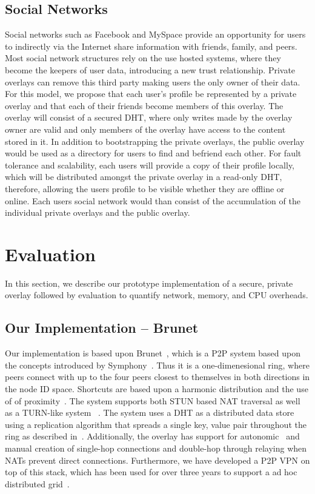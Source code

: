 \documentclass[conference]{IEEEtran}
\begin{document}
\subsection{Social Networks}
Social networks such as Facebook and MySpace provide an opportunity for users to
indirectly via the Internet share information with friends, family, and peers.
Most social network structures rely on the use hosted systems, where they become
the keepers of user data, introducing a new trust relationship.  Private overlays
can remove this third party making users the only owner of their data.  For this
model, we propose that each user's profile be represented by a private overlay
and that each of their friends become members of this overlay.  The overlay will
consist of a secured DHT, where only writes made by the overlay owner are valid
and only members of the overlay have access to the content stored in it.  In
addition to bootstrapping the private overlays, the public overlay would be
used as a directory for users to find and befriend each other.  For fault
tolerance and scalability, each users will provide a copy of their profile
locally, which will be distributed amongst the private overlay in a read-only
DHT, therefore, allowing the users profile to be visible whether they are
offline or online.  Each users social network would than consist of the
accumulation of the individual private overlays and the public overlay.

\section{Evaluation}
\label{evaluations}
In this section, we describe our prototype implementation of a secure, private
overlay followed by evaluation to quantify network, memory, and CPU overheads.

\subsection{Our Implementation -- Brunet}
Our implementation is based upon Brunet~\cite{brunet}, which is a P2P system
based upon the concepts introduced by Symphony~\cite{symphony}.  Thus it is a
one-dimenesional ring, where peers connect with up to the four peers closest
to themselves in both directions in the node ID space.  Shortcuts are based
upon a harmonic distribution and the use of of proximity~\cite{hpdc08_0}.  The
system supports both STUN based NAT traversal as well as a TURN-like system
~\cite{nsdi10}.  The system uses a DHT as a distributed data store using a
replication algorithm that spreads a single key, value pair throughout the ring
as described in~\cite{pcgrid07}.  Additionally, the overlay has support for
autonomic~\cite{wow} and manual creation of single-hop connections and double-hop
through relaying when NATs prevent direct connections.  Furthermore, we have
developed a P2P VPN on top of this stack, which has been used for over three
years to support a ad hoc distributed grid~\cite{archer, gridappliance}.
\end{document}
